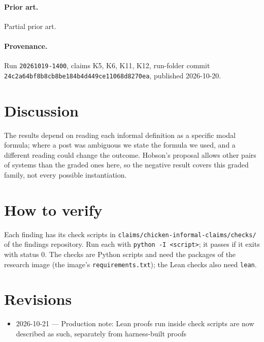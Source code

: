 \documentclass{article}
\begin{document}
\paragraph{Prior art.} Partial prior art.


\paragraph{Provenance.}
Run \texttt{20261019-1400}, claims K5, K6, K11, K12, run-folder commit \texttt{24c2a64bf8b8cb8be184b4d449ce11068d8270ea}, published 2026-10-20.

\section{Discussion}

The results depend on reading each informal definition as a specific modal formula; where a post
was ambiguous we state the formula we used, and a different reading could change the outcome.
Hobson's proposal allows other pairs of systems than the graded ones here, so the negative result
covers this graded family, not every possible instantiation.

\section{How to verify}

Each finding has its check scripts in \texttt{claims/chicken-informal-claims/checks/} of the findings repository. Run each with \texttt{python -I <script>}; it passes if it exits with status 0. The checks are Python scripts and need the packages of the research image (the image's \texttt{requirements.txt}); the Lean checks also need \texttt{lean}.

\section{Revisions}

\begin{itemize}
\item 2026-10-21 --- Production note: Lean proofs run inside check scripts are now described as such, separately from harness-built proofs
\end{itemize}



\end{document}
